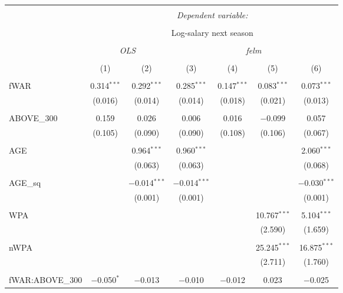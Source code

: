 
\begin{table}[!htbp] \centering
  \caption{}
  \label{}
  \scriptsize
\begin{tabular}{@{\extracolsep{5pt}}lcccccc}
\\[-1.8ex]\hline
\hline \\[-1.8ex]
 & \multicolumn{6}{c}{\textit{Dependent variable:}} \\
\cline{2-7}
\\[-1.8ex] & \multicolumn{6}{c}{Log-salary next season} \\ 
\\[-1.8ex] & \multicolumn{2}{c}{\textit{OLS}} & \multicolumn{4}{c}{\textit{felm}} \\
\\[-1.8ex] & (1) & (2) & (3) & (4) & (5) & (6)\\
\hline \\[-1.8ex]
 fWAR & 0.314$^{***}$ & 0.292$^{***}$ & 0.285$^{***}$ & 0.147$^{***}$ & 0.083$^{***}$ & 0.073$^{***}$ \\
  & (0.016) & (0.014) & (0.014) & (0.018) & (0.021) & (0.013) \\
  & & & & & & \\
 ABOVE\_300 & 0.159 & 0.026 & 0.006 & 0.016 & $-$0.099 & 0.057 \\
  & (0.105) & (0.090) & (0.090) & (0.108) & (0.106) & (0.067) \\
  & & & & & & \\
 AGE &  & 0.964$^{***}$ & 0.960$^{***}$ &  &  & 2.060$^{***}$ \\
  &  & (0.063) & (0.063) &  &  & (0.068) \\
  & & & & & & \\
 AGE\_sq &  & $-$0.014$^{***}$ & $-$0.014$^{***}$ &  &  & $-$0.030$^{***}$ \\
  &  & (0.001) & (0.001) &  &  & (0.001) \\
  & & & & & & \\
 WPA &  &  &  &  & 10.767$^{***}$ & 5.104$^{***}$ \\
  &  &  &  &  & (2.590) & (1.659) \\
  & & & & & & \\
 nWPA &  &  &  &  & 25.245$^{***}$ & 16.875$^{***}$ \\
  &  &  &  &  & (2.711) & (1.760) \\
  & & & & & & \\
 fWAR:ABOVE\_300 & $-$0.050$^{*}$ & $-$0.013 & $-$0.010 & $-$0.012 & 0.023 & $-$0.025 \\

\end{tabular}
\end{table}
